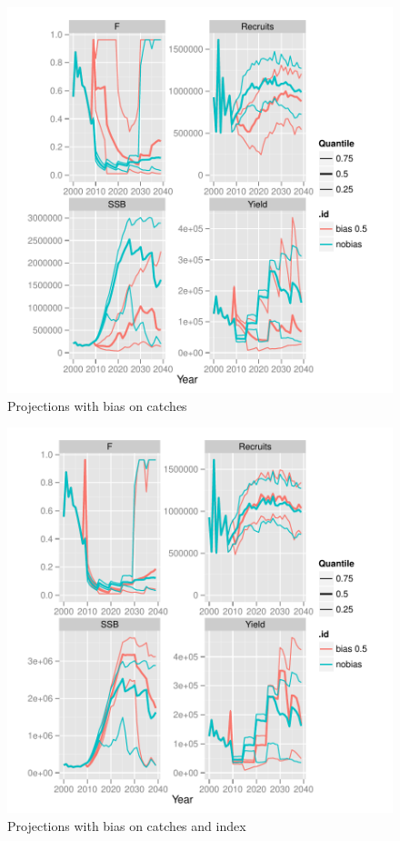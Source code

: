 \documentclass[a4paper]{article}
\begin{document}
\begin{figure}[H]
\centering
\includegraphics{MSE-006}
\caption{Projections with bias on catches}
\label{fig:cthBias}
\end{figure}

\begin{figure}[H]
\centering
\includegraphics{MSE-007}
\caption{Projections with bias on catches and index}
\label{fig:2Bias}
\end{figure}
\end{document}
